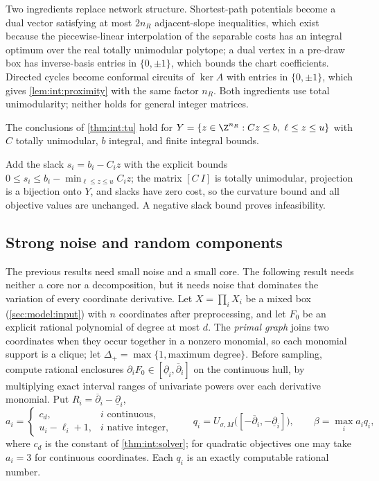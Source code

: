 Two ingredients replace network structure. Shortest-path potentials become a
dual vector satisfying at most $2n_R$ adjacent-slope inequalities, which exist
because the piecewise-linear interpolation of the separable costs has an
integral optimum over the real totally unimodular polytope; a dual vertex in a
pre-draw box has inverse-basis entries in $\{0,\pm1\}$, which bounds the chart
coefficients. Directed cycles become conformal circuits of $\ker A$ with entries
in $\{0,\pm1\}$, which gives \cref{lem:int:proximity} with the same factor
$n_R$. Both ingredients use total unimodularity; neither holds for general
integer matrices.

\begin{corollary}\label{cor:int:tu-ineq}
The conclusions of \cref{thm:int:tu} hold for
$Y=\{z\in\Z^{n_R}:Cz\le b,\ \ell\le z\le u\}$ with $C$ totally unimodular, $b$
integral, and finite integral bounds.
\end{corollary}

Add the slack $s_i=b_i-C_iz$ with the explicit bounds
$0\le s_i\le b_i-\min_{\ell\le z\le u}C_iz$; the matrix $[C\ I]$ is totally
unimodular, projection is a bijection onto $Y$, and slacks have zero cost, so
the curvature bound and all objective values are unchanged. A negative slack
bound proves infeasibility.

\subsection{Strong noise and random components}\label{sec:int:strong-field}

The previous results need small noise and a small core. The following result
needs neither a core nor a decomposition, but it needs noise that dominates
the variation of every coordinate derivative. Let $X=\prod_iX_i$ be a mixed
box (\cref{sec:model:input}) with $n$ coordinates after preprocessing, and let
$F_0$ be an explicit rational polynomial of degree at most $d$. The
\emph{primal graph} joins two coordinates when they occur together in a
nonzero monomial, so each monomial support is a clique; let
$\Delta_+=\max\{1,\text{maximum degree}\}$. Before sampling, compute rational
enclosures $\partial_iF_0\in[\underline\partial_i,\overline\partial_i]$ on the
continuous hull, by multiplying exact interval ranges of univariate powers
over each derivative monomial. Put $R_i=\overline\partial_i-\underline\partial_i$,
\[
 a_i=\begin{cases}c_d,&i\text{ continuous},\\u_i-\ell_i+1,&i\text{ native integer},
 \end{cases}\qquad
 q_i=U_{\sigma,M}\bigl([-\overline\partial_i,-\underline\partial_i]\bigr),\qquad
 \beta=\max_ia_iq_i,
\]
where $c_d$ is the constant of \cref{thm:int:solver}; for quadratic
objectives one may take $a_i=3$ for continuous coordinates. Each $q_i$ is an
exactly computable rational number.

